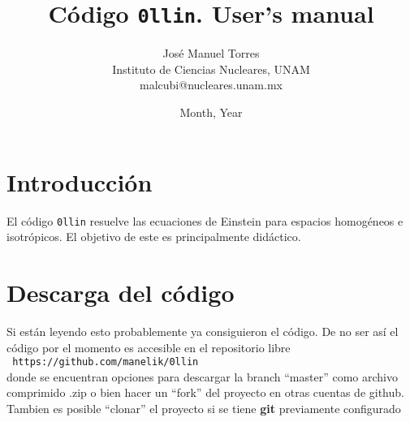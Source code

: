 \documentclass[12pt,fleqn,b5paper]{article}
\begin{document}

\renewcommand{\theequation}{\thesection.\arabic{equation}}

\parindent 0mm



\title{C\'odigo \texttt{0llin}.  User's manual}

\author{Jos\'e Manuel Torres \\
Instituto de Ciencias Nucleares, UNAM \\
malcubi@nucleares.unam.mx}

\date{Month, Year}

\maketitle

\tableofcontents



\pagebreak

\section{Introducci\'on}

El c\'odigo \texttt{0llin} resuelve las ecuaciones de Einstein para
espacios homogéneos e isotrópicos. El objetivo de este es
principalmente didáctico.



\section{Descarga del c\'odigo}

Si están leyendo esto probablemente ya consiguieron el c\'odigo. De no
ser así el código por el momento es accesible en el repositorio libre\\

\texttt{\footnotesize 
  https://github.com/manelik/0llin} \\

donde se encuentran opciones para descargar la branch ``master'' como
archivo comprimido .zip o bien hacer un ``fork'' del proyecto en otras
cuentas de github. Tambien es posible ``clonar'' el proyecto si se
tiene {\bf git} previamente configurado\\
\end{document}
